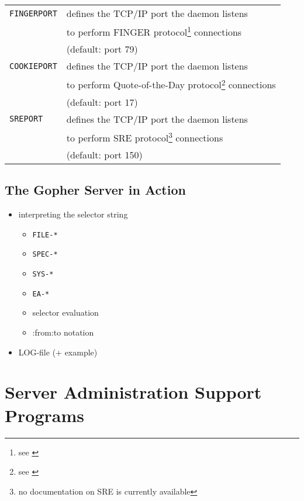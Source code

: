 \begin{table}
\begin{center}
\begin{minipage}{\textwidth}
\begin{tabular}{|l|l|}
{\tt FINGERPORT}& defines the TCP/IP port the daemon listens\\
                & to perform 
FINGER protocol\footnote{see \cite{rfc1288}} connections\\
                & (default: port 79) \\ \hline
 
{\tt COOKIEPORT}& defines the TCP/IP port the daemon listens\\
                & to perform 
Quote-of-the-Day protocol\footnote{see \cite{rfc865}} connections\\
                & (default: port 17) \\ \hline
 
{\tt SREPORT}  & defines the TCP/IP port the daemon listens\\
                & to perform 
SRE protocol\footnote{no documentation on SRE is currently 
available} connections\\
                & (default: port 150)\\ \hline
\end{tabular}
\end{minipage}
\end{center}
\end{table}



\subsection{The Gopher Server in Action}

\begin{itemize}
\item   interpreting the selector string
        \begin{itemize}
        \item   {\tt FILE-*}
        \item   {\tt SPEC-*}
        \item   {\tt SYS-*}
        \item   {\tt EA-*}
        \item   selector evaluation
        \item   :from:to notation
        \end{itemize}
\item   LOG-file (+ example)
\end{itemize}




\section{Server Administration Support Programs}

